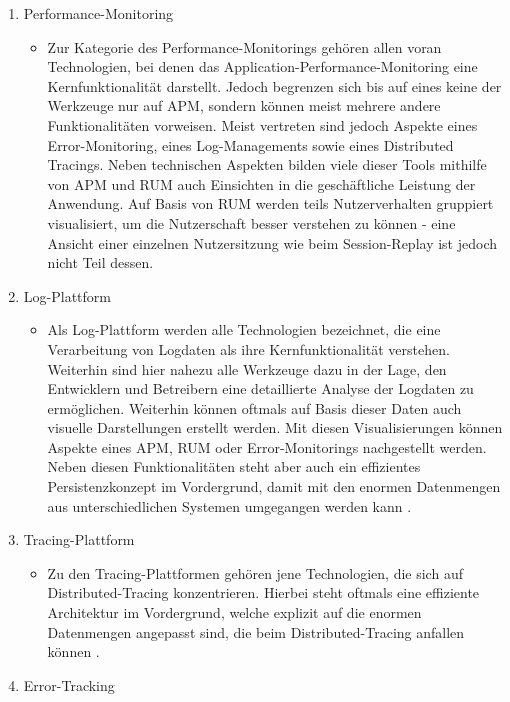 \begin{enumerate}
	\item Performance-Monitoring
	\begin{itemize}
		\item Zur Kategorie des Performance-Monitorings gehören allen voran Technologien, bei denen das Application-Performance-Monitoring eine Kernfunktionalität darstellt. Jedoch begrenzen sich bis auf eines keine der Werkzeuge nur auf APM, sondern können meist mehrere andere Funktionalitäten vorweisen. Meist vertreten sind jedoch Aspekte eines Error-Monitoring, eines Log-Managements sowie eines Distributed Tracings. Neben technischen Aspekten bilden viele dieser Tools mithilfe von APM und RUM auch Einsichten in die geschäftliche Leistung der Anwendung. Auf Basis von RUM werden teils Nutzerverhalten gruppiert visualisiert, um die Nutzerschaft besser verstehen zu können - eine Ansicht einer einzelnen Nutzersitzung wie beim Session-Replay ist jedoch nicht Teil dessen.
	\end{itemize}
	\item Log-Plattform
	\begin{itemize}
		\item Als Log-Plattform werden alle Technologien bezeichnet, die eine Verarbeitung von Logdaten als ihre Kernfunktionalität verstehen. Weiterhin sind hier nahezu alle Werkzeuge dazu in der Lage, den Entwicklern und Betreibern eine detaillierte Analyse der Logdaten zu ermöglichen. Weiterhin können oftmals auf Basis dieser Daten auch visuelle Darstellungen erstellt werden. Mit diesen Visualisierungen können Aspekte eines APM, RUM oder Error-Monitorings nachgestellt werden. Neben diesen Funktionalitäten steht aber auch ein effizientes Persistenzkonzept im Vordergrund, damit mit den enormen Datenmengen aus unterschiedlichen Systemen umgegangen werden kann \cite{TowardsAutomatedLogParsingForLargeScale}.
	\end{itemize}
	\item Tracing-Plattform
	\begin{itemize}
		\item Zu den Tracing-Plattformen gehören jene Technologien, die sich auf Distributed-Tracing konzentrieren. Hierbei steht oftmals eine effiziente Architektur im Vordergrund, welche explizit auf die enormen Datenmengen angepasst sind, die beim Distributed-Tracing anfallen können \cite{DapperInfrastructure}.
	\end{itemize}
	\item Error-Tracking
	\begin{itemize}

\end{itemize}
\end{enumerate}

